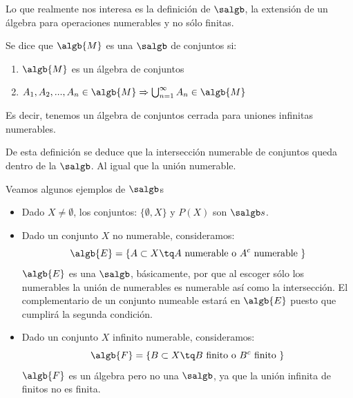 \documentclass{apuntes}
\begin{document}
Lo que realmente nos interesa es la definición de $\salgb$, la extensión de un álgebra para operaciones numerables y no sólo finitas.

\begin{defn}[{σ}-álgebra]
Se dice que $\algb{M}$ es una $\salgb$ de conjuntos si:
\begin{enumerate}
\item $\algb{M}$ es un álgebra de conjuntos
\item $A_1,A_2,...,A_n \in \algb{M} \Rightarrow \bigcup_{n=1}^{\infty} A_n\in \algb{M}$
\end{enumerate}
Es decir, tenemos un álgebra de conjuntos cerrada para uniones infinitas numerables.

\end{defn}

De esta definición se deduce que la intersección numerable de conjuntos queda dentro de la $\salgb$. Al igual que la unión numerable.

\begin{example}
Veamos algunos ejemplos de $\salgb$s
\begin{itemize}
\item Dado $X\neq \emptyset$, los conjuntos: $\lbrace \emptyset, X \rbrace$  y $P(X)$ son $\salgb s$.

\item Dado un conjunto $X$ no numerable, consideramos:
\[\algb{E}=\lbrace A \subset X \tq A \text{ numerable o } A^c \text{ numerable }\rbrace\]
$\algb{E}$ es una $\salgb$, básicamente, por que al escoger sólo los numerables la unión de numerables es numerable así como la intersección. El complementario de un conjunto numeable estará en $\algb{E}$ puesto que cumplirá la segunda condición.


\item Dado un conjunto $X$ infinito numerable, consideramos:
\[\algb{F}=\lbrace B \subset X \tq B \text{ finito o } B^c \text{ finito }\rbrace\]
$\algb{F}$ es un álgebra pero no una $\salgb$, ya que la unión infinita de finitos no es finita.
\end{itemize}
\end{example}
\end{document}
